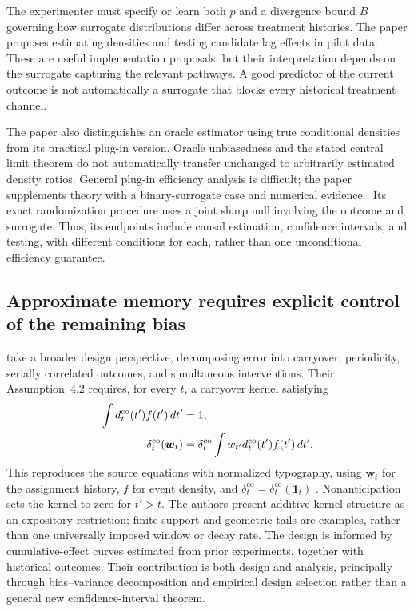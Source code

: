 The experimenter must specify or learn both $p$ and a divergence bound $B$ governing how surrogate distributions differ across treatment histories. The paper proposes estimating densities and testing candidate lag effects in pilot data. These are useful implementation proposals, but their interpretation depends on the surrogate capturing the relevant pathways. A good predictor of the current outcome is not automatically a surrogate that blocks every historical treatment channel.

The paper also distinguishes an oracle estimator using true conditional densities from its practical plug-in version. Oracle unbiasedness and the stated central limit theorem do not automatically transfer unchanged to arbitrarily estimated density ratios. General plug-in efficiency analysis is difficult; the paper supplements theory with a binary-surrogate case and numerical evidence \citep[Sections~3--5]{chen2026}. Its exact randomization procedure uses a joint sharp null involving the outcome and surrogate. Thus, its endpoints include causal estimation, confidence intervals, and testing, with different conditions for each, rather than one unconditional efficiency guarantee.

\subsection{Approximate memory requires explicit control of the remaining bias}

\citet{xiong2024} take a broader design perspective, decomposing error into carryover, periodicity, serially correlated outcomes, and simultaneous interventions. Their Assumption~4.2 requires, for every $t$, a carryover kernel satisfying
\begin{align}
 \int d_t^{\mathrm{co}}(t')f(t')\,dt'&=1,\notag\\
 \delta_t^{\mathrm{co}}(\boldsymbol w_t)
 &=\delta_t^{\mathrm{co}}\int w_{t'}d_t^{\mathrm{co}}(t')f(t')\,dt'.
 \label{eq:xiong-carryover-kernel}
\end{align}
This reproduces the source equations with normalized typography, using $\boldsymbol w_t$ for the assignment history, $f$ for event density, and $\delta_t^{\mathrm{co}}=\delta_t^{\mathrm{co}}(\boldsymbol1_t)$ \citep[Assumption~4.2, p.~21]{xiong2024}. Nonanticipation sets the kernel to zero for $t'>t$. The authors present additive kernel structure as an expository restriction; finite support and geometric tails are examples, rather than one universally imposed window or decay rate. The design is informed by cumulative-effect curves estimated from prior experiments, together with historical outcomes. Their contribution is both design and analysis, principally through bias--variance decomposition and empirical design selection rather than a general new confidence-interval theorem.

